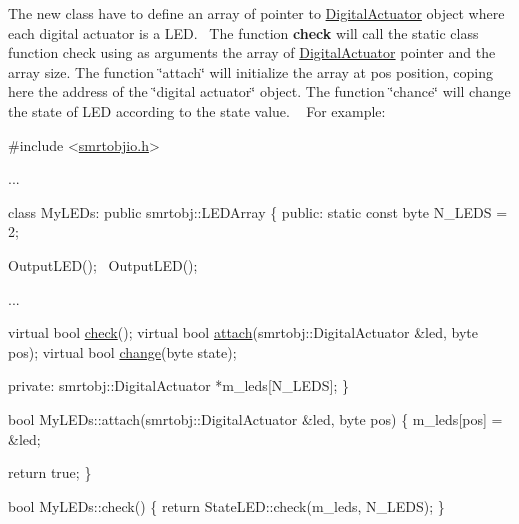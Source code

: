 The new class have to define an array of pointer to \hyperlink{classsmrtobj_1_1io_1_1_digital_actuator}{Digital\+Actuator} object where each digital actuator is a L\+E\+D.~\newline
The function {\bfseries check} will call the static class function {\ttfamily check} using as arguments the array of \hyperlink{classsmrtobj_1_1io_1_1_digital_actuator}{Digital\+Actuator} pointer and the array size. The function \char`\"{}attach\char`\"{} will initialize the array at {\ttfamily pos} position, coping here the address of the \char`\"{}digital actuator\char`\"{} object. The function \char`\"{}chance\char`\"{} will change the state of L\+E\+D according to the state value. ~\newline
For example\+:


\begin{DoxyCode}
\textcolor{preprocessor}{#include <\hyperlink{smrtobjio_8h}{smrtobjio.h}>}

...

class MyLEDs: \textcolor{keyword}{public} smrtobj::LEDArray
\{
  \textcolor{keyword}{public}:
    \textcolor{keyword}{static} \textcolor{keyword}{const} byte N\_LEDS = 2;

    OutputLED();
    ~OutputLED();

    ...

    \textcolor{keyword}{virtual} \textcolor{keywordtype}{bool} \hyperlink{classsmrtobj_1_1io_1_1_l_e_d_array_a7fda2a4c901cf158beb7dc0e3c57cbe9}{check}();
    \textcolor{keyword}{virtual} \textcolor{keywordtype}{bool} \hyperlink{classsmrtobj_1_1io_1_1_l_e_d_array_a22376f08e9efc09bcb7a28fd797b8161}{attach}(smrtobj::DigitalActuator &led, byte pos);
    \textcolor{keyword}{virtual} \textcolor{keywordtype}{bool} \hyperlink{classsmrtobj_1_1io_1_1_l_e_d_array_aaab58b896ed1ffafa272e7813d60d2bf}{change}(byte state);

    \textcolor{keyword}{private}:
      smrtobj::DigitalActuator *m\_leds[N\_LEDS];
\}

\textcolor{keywordtype}{bool} MyLEDs::attach(smrtobj::DigitalActuator &led, byte pos)
\{
  m\_leds[pos] = &led;

  \textcolor{keywordflow}{return} \textcolor{keyword}{true};
\}

\textcolor{keywordtype}{bool} MyLEDs::check()
\{
  \textcolor{keywordflow}{return} StateLED::check(m\_leds, N\_LEDS);
\}


\end{DoxyCode}

